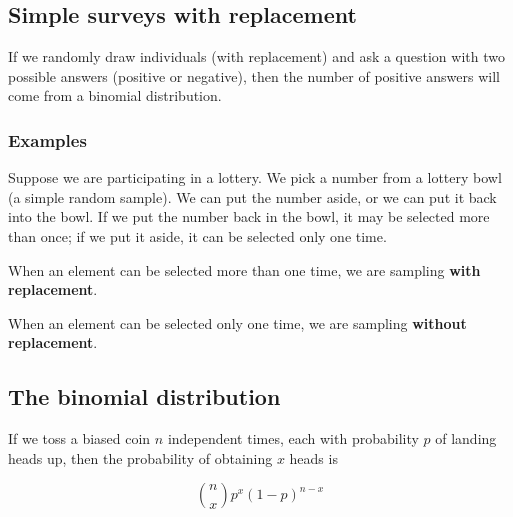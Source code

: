 \documentclass[12pt,a4paper]{article}
\theoremstyle{regla}
\theoremstyle{remark}
\theoremstyle{definition}
\theoremstyle{nonumberbreak}
\begin{document}
\subsection{Simple surveys with replacement}
\begin{fbox}
\begin{minipage}{0.97\textwidth}
If we randomly draw individuals (with replacement) and ask a question with two possible answers 
(positive or negative), then the number of positive answers will come from a binomial 
distribution.




\end{minipage}
\end{fbox}
\subsubsection{Examples}
\begin{xmpl}
Suppose we are participating in a lottery. We pick a number from a lottery bowl (a simple random sample). We can put the number aside, or we can put it back into the bowl. If we put the number back in the bowl, it may be selected more than once; if we put it aside, it can be selected only one time. 

\begin{defn}
When an element can be selected more than one time, we are sampling {\bf with replacement}. 
\end{defn}
\begin{defn}
When an element can be selected only one time, we are sampling {\bf without replacement}.
\end{defn}
\end{xmpl}

\subsection{The binomial distribution}
\begin{fbox}
\begin{minipage}{0.97\textwidth}
If we toss a biased coin $n$ independent times, each with probability $p$ of landing heads up, then the probability of obtaining $x$ heads is

$$
{n \choose x}p^x (1-p)^{n-x}
$$

\end{minipage}
\end{fbox}
\end{document}
